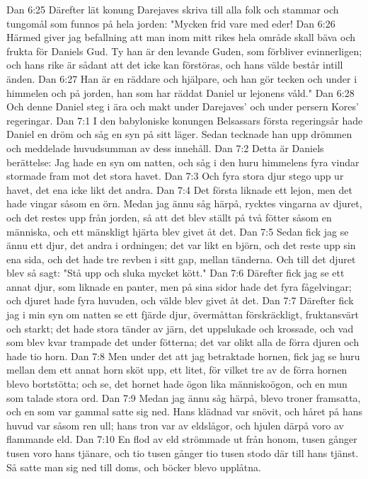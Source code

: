 Dan 6:25  Därefter lät konung Darejaves skriva till alla folk och stammar och tungomål som funnos på hela jorden: "Mycken frid vare med eder!
Dan 6:26  Härmed giver jag befallning att man inom mitt rikes hela område skall bäva och frukta för Daniels Gud. Ty han är den levande Guden, som förbliver evinnerligen; och hans rike är sådant att det icke kan förstöras, och hans välde består intill änden.
Dan 6:27  Han är en räddare och hjälpare, och han gör tecken och under i himmelen och på jorden, han som har räddat Daniel ur lejonens våld."
Dan 6:28  Och denne Daniel steg i ära och makt under Darejaves' och under persern Kores' regeringar.
Dan 7:1  I den babyloniske konungen Belsassars första regeringsår hade Daniel en dröm och såg en syn på sitt läger. Sedan tecknade han upp drömmen och meddelade huvudsumman av dess innehåll.
Dan 7:2  Detta är Daniels berättelse: Jag hade en syn om natten, och såg i den huru himmelens fyra vindar stormade fram mot det stora havet.
Dan 7:3  Och fyra stora djur stego upp ur havet, det ena icke likt det andra.
Dan 7:4  Det första liknade ett lejon, men det hade vingar såsom en örn. Medan jag ännu såg härpå, rycktes vingarna av djuret, och det restes upp från jorden, så att det blev ställt på två fötter såsom en människa, och ett mänskligt hjärta blev givet åt det.
Dan 7:5  Sedan fick jag se ännu ett djur, det andra i ordningen; det var likt en björn, och det reste upp sin ena sida, och det hade tre revben i sitt gap, mellan tänderna. Och till det djuret blev så sagt: "Stå upp och sluka mycket kött."
Dan 7:6  Därefter fick jag se ett annat djur, som liknade en panter, men på sina sidor hade det fyra fågelvingar; och djuret hade fyra huvuden, och välde blev givet åt det.
Dan 7:7  Därefter fick jag i min syn om natten se ett fjärde djur, övermåttan förskräckligt, fruktansvärt och starkt; det hade stora tänder av järn, det uppslukade och krossade, och vad som blev kvar trampade det under fötterna; det var olikt alla de förra djuren och hade tio horn.
Dan 7:8  Men under det att jag betraktade hornen, fick jag se huru mellan dem ett annat horn sköt upp, ett litet, för vilket tre av de förra hornen blevo bortstötta; och se, det hornet hade ögon lika människoögon, och en mun som talade stora ord.
Dan 7:9  Medan jag ännu såg härpå, blevo troner framsatta, och en som var gammal satte sig ned. Hans klädnad var snövit, och håret på hans huvud var såsom ren ull; hans tron var av eldslågor, och hjulen därpå voro av flammande eld.
Dan 7:10  En flod av eld strömmade ut från honom, tusen gånger tusen voro hans tjänare, och tio tusen gånger tio tusen stodo där till hans tjänst. Så satte man sig ned till doms, och böcker blevo upplåtna.
